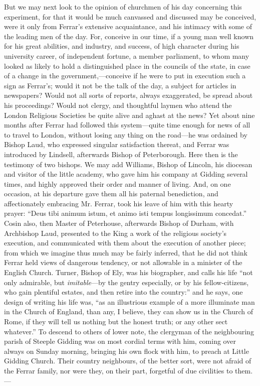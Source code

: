 But we may next look to the opinion of churchmen of
his day concerning this experiment, for that it would be much
canvassed and discussed may be conceived, were it only from Ferrar's
extensive acquaintance, and his intimacy with some of the leading men of
the day. For, conceive in our time, if a young man well known for his
great abilities, and industry, and success, of high character during his
university career, of independent fortune, a member parliament, to whom
many looked as likely to hold a distinguished place in the councils of
the state, in case of a change in the government,—conceive if he were
to put in execution such a sign as Ferrar's; would it not be the talk of
the day, a subject for articles in newspapers? Would not all sorts of
reports, always exaggerated, be spread about his proceedings? Would not
clergy, and thoughtful laymen who attend the London Religious Societies
be quite alive and aghast at the news? Yet about nine months after
Ferrar had followed this system—quite time enough for news of all to
travel to London, without losing any thing on the road—he was ordained
by Bishop Laud, who expressed singular satisfaction thereat, and Ferrar
was introduced by Lindsell, afterwards Bishop of Peterborough. Here then
is the testimony of two bishops. We may add Williams, Bishop of Lincoln,
his diocesan and visitor of the little academy, who gave him his company
at Gidding several times, and highly approved their order and manner of
living. And, on one occasion, at his departure gave them all his
paternal benediction, and affectionately embracing Mr. Ferrar, took his
leave of him with this hearty prayer: ``Deus tibi animum istum, et animo
isti tempus longissimum concedat.'' Cosin also, then Master of Peterhouse,
afterwards Bishop of Durham, with Archbishop Laud, presented to the King
a work of the religious society's execution, and communicated with them
about the execution of another piece; from which we imagine thus much
may be fairly inferred, that he did not think Ferrar held views of
dangerous tendency, or not allowable in a minister of the English
Church. Turner, Bishop of Ely, was his biographer, and calls his life ``not
only admirable, but \emph{imitable}—by the gentry especially, or by
his fellow-citizens, who gain plentiful estates, and then retire into
the country:'' and he says, one design of writing his life was, ``as an
illustrious example of a more illuminate man in the Church of England,
than any, I believe, they can show us in the Church of Rome, if they
will tell us nothing but the honest truth; or any other sect whatever.''
To descend to others of lower note, the clergyman of the neighbouring
parish of Steeple Gidding was on most cordial terms with him, coming
over always on Sunday morning, bringing his own flock with him, to
preach at Little Gidding Church. Their country neighbours, of the better
sort, were not afraid of the Ferrar family, nor were they, on
their part, forgetful of due civilities to them.—

